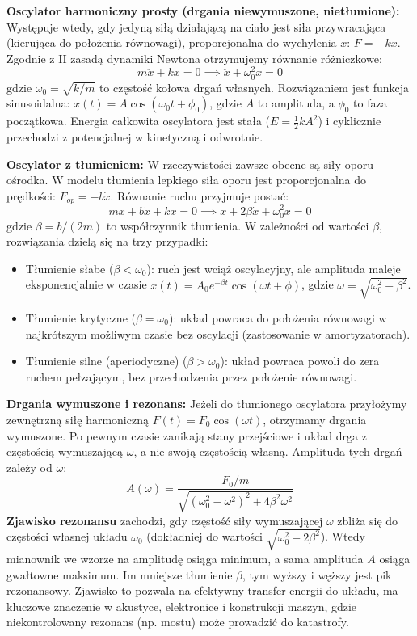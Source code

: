 \documentclass[11pt, a4paper]{article}
\begin{document}
\textbf{Oscylator harmoniczny prosty (drgania niewymuszone, nietłumione):}
Występuje wtedy, gdy jedyną siłą działającą na ciało jest siła przywracająca (kierująca do położenia równowagi), proporcjonalna do wychylenia $x$: $F = -kx$. Zgodnie z II zasadą dynamiki Newtona otrzymujemy równanie różniczkowe:
\[
m\ddot{x} + kx = 0 \implies \ddot{x} + \omega_0^2 x = 0
\]
gdzie $\omega_0 = \sqrt{k/m}$ to częstość kołowa drgań własnych. Rozwiązaniem jest funkcja sinusoidalna: $x(t) = A \cos(\omega_0 t + \phi_0)$, gdzie $A$ to amplituda, a $\phi_0$ to faza początkowa. Energia całkowita oscylatora jest stała ($E = \frac{1}{2}kA^2$) i cyklicznie przechodzi z potencjalnej w kinetyczną i odwrotnie.

\textbf{Oscylator z tłumieniem:}
W rzeczywistości zawsze obecne są siły oporu ośrodka. W modelu tłumienia lepkiego siła oporu jest proporcjonalna do prędkości: $F_{op} = -b\dot{x}$. Równanie ruchu przyjmuje postać:
\[
m\ddot{x} + b\dot{x} + kx = 0 \implies \ddot{x} + 2\beta\dot{x} + \omega_0^2 x = 0
\]
gdzie $\beta = b/(2m)$ to współczynnik tłumienia. W zależności od wartości $\beta$, rozwiązania dzielą się na trzy przypadki:
\begin{itemize}
    \item Tłumienie słabe ($\beta < \omega_0$): ruch jest wciąż oscylacyjny, ale amplituda maleje eksponencjalnie w czasie $x(t) = A_0 e^{-\beta t}\cos(\omega t + \phi)$, gdzie $\omega = \sqrt{\omega_0^2 - \beta^2}$.
    \item Tłumienie krytyczne ($\beta = \omega_0$): układ powraca do położenia równowagi w najkrótszym możliwym czasie bez oscylacji (zastosowanie w amortyzatorach).
    \item Tłumienie silne (aperiodyczne) ($\beta > \omega_0$): układ powraca powoli do zera ruchem pełzającym, bez przechodzenia przez położenie równowagi.
\end{itemize}

\textbf{Drgania wymuszone i rezonans:}
Jeżeli do tłumionego oscylatora przyłożymy zewnętrzną siłę harmoniczną $F(t) = F_0 \cos(\omega t)$, otrzymamy drgania wymuszone. Po pewnym czasie zanikają stany przejściowe i układ drga z częstością wymuszającą $\omega$, a nie swoją częstością własną. Amplituda tych drgań zależy od $\omega$:
\[
A(\omega) = \frac{F_0/m}{\sqrt{(\omega_0^2 - \omega^2)^2 + 4\beta^2\omega^2}}
\]
\textbf{Zjawisko rezonansu} zachodzi, gdy częstość siły wymuszającej $\omega$ zbliża się do częstości własnej układu $\omega_0$ (dokładniej do wartości $\sqrt{\omega_0^2 - 2\beta^2}$). Wtedy mianownik we wzorze na amplitudę osiąga minimum, a sama amplituda $A$ osiąga gwałtowne maksimum. Im mniejsze tłumienie $\beta$, tym wyższy i węższy jest pik rezonansowy. Zjawisko to pozwala na efektywny transfer energii do układu, ma kluczowe znaczenie w akustyce, elektronice i konstrukcji maszyn, gdzie niekontrolowany rezonans (np. mostu) może prowadzić do katastrofy.
\end{document}
